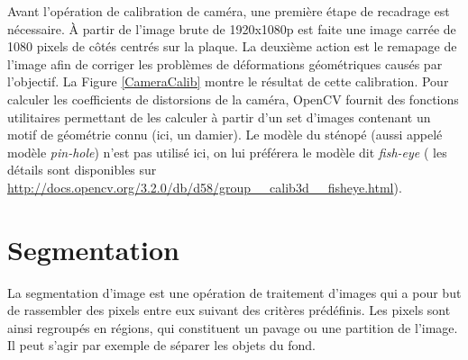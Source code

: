 Avant l'opération de calibration de caméra, une première étape de recadrage est nécessaire.
À partir de l’image brute de 1920x1080p est faite une image carrée de 1080 pixels de côtés centrés sur la plaque.
La deuxième action est le remapage de l’image afin de corriger les problèmes de déformations géométriques causés par l’objectif.
La Figure \ref{CameraCalib} montre le résultat de cette calibration.
Pour calculer les coefficients de distorsions de la caméra, OpenCV fournit des fonctions utilitaires permettant de les calculer à partir d’un set d’images contenant un motif de géométrie connu (ici, un damier).
Le modèle du sténopé (aussi appelé modèle \emph{pin-hole}) n'est pas utilisé ici, on lui préférera le modèle dit \emph{fish-eye} ( les détails sont disponibles sur \url{http://docs.opencv.org/3.2.0/db/d58/group__calib3d__fisheye.html}).

    
    \section{Segmentation}
    
La segmentation d'image est une opération de traitement d'images qui a pour but de
rassembler des pixels entre eux suivant des critères prédéfinis.
Les pixels sont ainsi regroupés en régions, qui constituent un pavage ou une partition de l'image.
Il peut s'agir par exemple de séparer les objets du fond.

